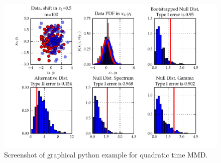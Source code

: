\begin{figure}\centering
		\includegraphics{fig/statistical_testing/quadratic_time_mmd}
		\caption{Screenshot of graphical python example for quadratic time MMD.}
		\label{fig:statistical_testing-quadratic_time_mmd}
\end{figure}